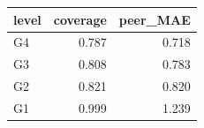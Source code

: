\begin{tabular}{lrr}
\toprule
level & coverage & peer_MAE \\
\midrule
G4 & 0.787 & 0.718 \\
G3 & 0.808 & 0.783 \\
G2 & 0.821 & 0.820 \\
G1 & 0.999 & 1.239 \\
\bottomrule
\end{tabular}
